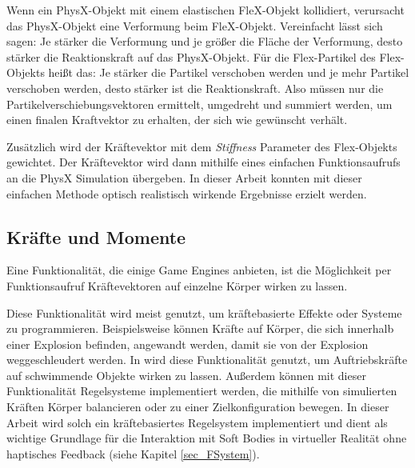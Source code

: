 Wenn ein PhysX-Objekt mit einem elastischen FleX-Objekt kollidiert, verursacht das PhysX-Objekt eine Verformung beim FleX-Objekt. Vereinfacht lässt sich sagen: Je stärker die Verformung und je größer die Fläche der Verformung, desto stärker die Reaktionskraft auf das PhysX-Objekt. Für die Flex-Partikel des Flex-Objekts heißt das: Je stärker die Partikel verschoben werden und je mehr Partikel verschoben werden, desto stärker ist die Reaktionskraft. Also müssen nur die Partikelverschiebungsvektoren ermittelt, umgedreht und summiert werden, um einen finalen Kraftvektor zu erhalten, der sich wie gewünscht verhält. 

Zusätzlich wird der Kräftevektor mit dem \textit{Stiffness} Parameter des Flex-Objekts gewichtet.
Der Kräftevektor wird dann mithilfe eines einfachen Funktionsaufrufs an die PhysX Simulation übergeben.
In dieser Arbeit konnten mit dieser einfachen Methode optisch realistisch wirkende Ergebnisse erzielt werden.


\subsection{Kräfte und Momente}
\label{subsec_forces}

Eine Funktionalität, die einige Game Engines anbieten, ist die Möglichkeit per Funktionsaufruf Kräftevektoren auf einzelne Körper wirken zu lassen. 

Diese Funktionalität wird meist genutzt, um kräftebasierte Effekte oder Systeme zu programmieren. Beispielsweise können Kräfte auf Körper, die sich innerhalb einer Explosion befinden, angewandt werden, damit sie von der Explosion weggeschleudert werden. 
In \cite{Studienarbeit} wird diese Funktionalität genutzt, um Auftriebskräfte auf schwimmende Objekte wirken zu lassen. 
Außerdem können mit dieser Funktionalität Regelsysteme implementiert werden, die mithilfe von simulierten Kräften Körper balancieren oder zu einer Zielkonfiguration bewegen. In dieser Arbeit wird solch ein kräftebasiertes Regelsystem implementiert und dient als wichtige Grundlage für die Interaktion mit Soft Bodies in virtueller Realität ohne haptisches Feedback (siehe Kapitel \ref{sec_FSystem}).

